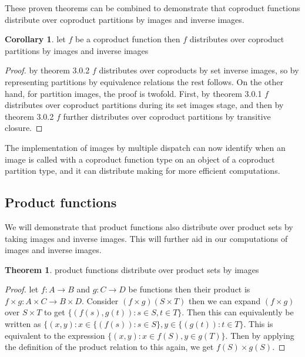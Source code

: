 \documentclass[a4paper,11pt, notitlepage]{report}
\theoremstyle{definition}
\newtheorem{theorem}{Theorem}[section]
\newtheorem{corollary}{Corollary}[section]
\begin{document}
\newpage

These proven theorems can be combined to demonstrate that coproduct functions distribute over coproduct partitions by images and inverse images.

\begin{corollary}
let $f$ be a coproduct function then $f$ distributes over coproduct partitions by images and inverse images
\end{corollary}

\begin{proof}
by theorem 3.0.2 $f$ distributes over coproducts by set inverse images, so by representing partitions by equivalence relations the rest follows. On the other hand, for partition images, the proof is twofold. First, by theorem 3.0.1 $f$ distributes over coproduct partitions during its set images stage, and then by theorem 3.0.2 $f$ further distributes over coproduct partitions by transitive closure.
\end{proof}

The implementation of images by multiple dispatch can now identify when an image is called with a coproduct function type on an object of a coproduct partition type, and it can distribute making for more efficient computations.

\subsection{Product functions}
We will demonstrate that product functions also distribute over product sets by taking images and inverse images. This will further aid in our computations of images and inverse images.

\begin{theorem} product functions distribute over product sets by images
\end{theorem}

\begin{proof}
let $f: A \to B$ and $g : C \to D$ be functions then their product is $f \times g: A \times C \to B \times D$. Consider $(f \times g)(S \times T)$ then we can expand $(f \times g)$ over $S \times T$ to get $\{(f(s),g(t)): s \in S, t \in T\}$. Then this can equivalently be written as $\{(x,y) : x \in \{(f(s)) : s \in S\}, y \in \{(g(t)) : t \in T\}$. This is equivalent to the expression $\{(x,y) : x \in f(S), y \in g(T) \}$. Then by applying the definition of the product relation to this again, we get $f(S) \times g(S)$.
\end{proof}
\end{document}
